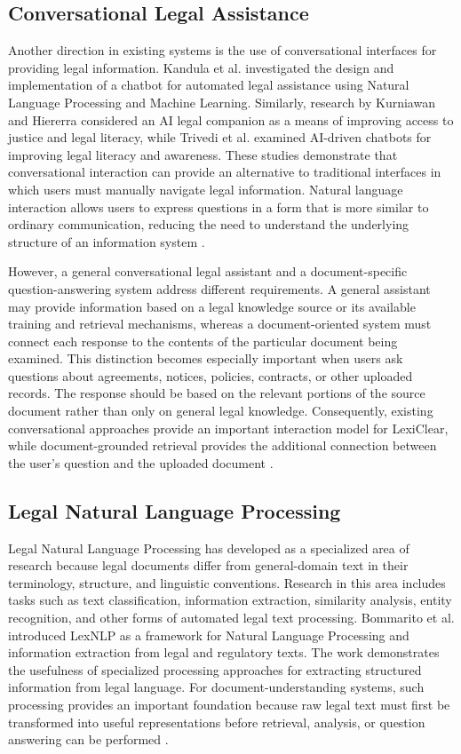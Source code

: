 \documentclass[12pt,a4paper,oneside]{report}
\begin{document}
\subsection{Conversational Legal Assistance}

Another direction in existing systems is the use of conversational interfaces
for providing legal information. Kandula et al. investigated the design and
implementation of a chatbot for automated legal assistance using Natural
Language Processing and Machine Learning. Similarly, research by Kurniawan
and Hiererra considered an AI legal companion as a means of improving access
to justice and legal literacy, while Trivedi et al. examined AI-driven
chatbots for improving legal literacy and awareness. These studies demonstrate
that conversational interaction can provide an alternative to traditional
interfaces in which users must manually navigate legal information. Natural
language interaction allows users to express questions in a form that is more
similar to ordinary communication, reducing the need to understand the
underlying structure of an information system
\cite{kandula2023,kurniawan2024,trivedi2024}.

However, a general conversational legal assistant and a document-specific
question-answering system address different requirements. A general assistant
may provide information based on a legal knowledge source or its available
training and retrieval mechanisms, whereas a document-oriented system must
connect each response to the contents of the particular document being
examined. This distinction becomes especially important when users ask
questions about agreements, notices, policies, contracts, or other uploaded
records. The response should be based on the relevant portions of the source
document rather than only on general legal knowledge. Consequently, existing
conversational approaches provide an important interaction model for
LexiClear, while document-grounded retrieval provides the additional
connection between the user's question and the uploaded document
\cite{kandula2023,dutta2024,muthuraju2025}.

\subsection{Legal Natural Language Processing}

Legal Natural Language Processing has developed as a specialized area of
research because legal documents differ from general-domain text in their
terminology, structure, and linguistic conventions. Research in this area
includes tasks such as text classification, information extraction,
similarity analysis, entity recognition, and other forms of automated legal
text processing. Bommarito et al. introduced LexNLP as a framework for
Natural Language Processing and information extraction from legal and
regulatory texts. The work demonstrates the usefulness of specialized
processing approaches for extracting structured information from legal
language.
For document-understanding systems, such processing provides an important
foundation because raw legal text must first be transformed into useful
representations before retrieval, analysis, or question answering can be
performed
\cite{bommarito2018lexnlp}.
\end{document}
